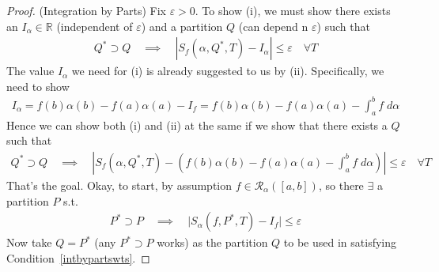 \documentclass[12pt]{book}
\numberwithin{equation}{section} %
\theoremstyle{plain}
\theoremstyle{definition}
\theoremstyle{remark}
\newcommand{\sR}{\mathscr{R}}
\newcommand{\R}{\mathbb{R}}
\begin{document}
\begin{proof}(Integration by Parts)
Fix $\varepsilon>0$. To show (i), we must show there exists an
$I_\alpha\in\R$ (independent of $\varepsilon$) and a partition $Q$ (can
depend n $\varepsilon$) such that
\begin{align}
  Q^*\supset Q\quad\implies\quad
  |S_f(\alpha,Q^*,T)-I_\alpha|\leq\varepsilon
  \quad \forall T
  \label{intbypartscond}
\end{align}
The value $I_\alpha$ we need for (i) is already suggested to us by (ii).
Specifically, we need to show
\begin{align*}
  I_\alpha
  = f(b)\alpha(b)-f(a)\alpha(a)-I_f
  = f(b)\alpha(b)-f(a)\alpha(a)-\int^b_af\;d\alpha
\end{align*}
Hence we can show both (i) and (ii) at the same if we show that
there exists a $Q$ such that
\begin{align}
  Q^*\supset Q\quad\implies\quad
  \left\lvert
    S_f(\alpha,Q^*,T)-
    \left(
    f(b)\alpha(b)-f(a)\alpha(a)
    - \int^b_a f\; d\alpha
  \right)
  \right\rvert
  \leq\varepsilon
  \quad \forall T
  \label{intbypartswts}
\end{align}
That's the goal. Okay, to start, by assumption $f\in\sR_\alpha([a,b])$,
so there $\exists$ a partition $P$ s.t.
\begin{align}
  P^*\supset P\quad\implies\quad
  \lvert S_\alpha(f,P^*,T) - I_f \rvert \leq \varepsilon
  \label{intbypartscond2}
\end{align}
Now take $Q=P^*$ (any $P^*\supset P$ works) as the partition $Q$ to be
used in satisfying Condition~\ref{intbypartswts}.


\end{proof}
\end{document}
